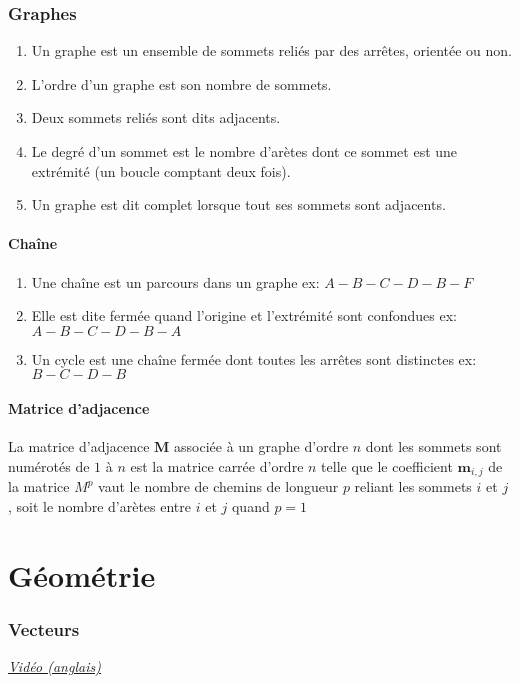 \documentclass{article}
\begin{document}
\section{Graphes}
\begin{enumerate}
	\item Un graphe est un ensemble de sommets reliés par des arrêtes, orientée ou non.
	\item L'ordre d'un graphe est son nombre de sommets.
	\item Deux sommets reliés sont dits adjacents.
	\item Le degré d'un sommet est le nombre d'arètes dont ce sommet est une extrémité (un boucle comptant deux fois).
	\item Un graphe est dit complet lorsque tout ses sommets sont adjacents.
\end{enumerate}
\subsection{Chaîne}
\begin{enumerate}
	\item Une chaîne est un parcours dans un graphe ex: $A-B-C-D-B-F$
	\item Elle est dite fermée quand l'origine et l'extrémité sont confondues ex: $A-B-C-D-B-A$
	\item Un cycle est une chaîne fermée dont toutes les arrêtes sont distinctes ex: $B-C-D-B$
\end{enumerate}
\subsection{Matrice d'adjacence}
La matrice d'adjacence $\mathbf{M}$ associée à un graphe d'ordre $n$ dont les sommets sont numérotés de $1$ à $n$ est la matrice carrée d'ordre $n$ telle que le coefficient $\mathbf{m}_{i,j}$ de la matrice $M^p$ vaut le nombre de chemins de longueur $p$ reliant les sommets $i$ et $j$, soit le nombre d'arètes entre $i$ et $j$ quand $p=1$




\pagebreak\part{Géométrie}
\setcounter{section}{0}
\renewcommand*{\theHsection}{chX.\the\value{section}}


\section{Vecteurs}
\href{https://youtu.be/fNk_zzaMoSs}{\underline{\textit{Vidéo (anglais)}}}\\
\break
\end{document}
